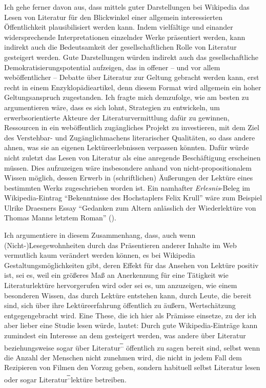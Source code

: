 \documentclass[fontsize=12pt]{scrartcl}
\begin{document}
Ich gehe ferner davon aus, dass mittels guter Darstellungen bei Wi\-ki\-pe\-dia das Lesen von Li\-te\-ra\-tur f\"ur den Blickwinkel einer allgemein interessierten \"Of\-fent\-lichkeit plausibilisiert werden kann. Indem vielf\"altige und einander widersprechende Interpretationen einzelnder Werke pr\"asentiert werden, kann indirekt auch die Bedeutsamkeit der ge\-sell\-schaftlichen Rolle von Li\-te\-ra\-tur gesteigert werden. Gute Darstellungen w\"urden indirekt auch das ge\-sell\-schaftliche Demokratisierungspotential aufzeigen, das in offener -- und vor allem web\"of\-fent\-licher -- Debatte \"uber Li\-te\-ra\-tur zur Geltung gebracht werden kann, erst recht in einem Enzy\-klop\"adieartikel, denn diesem Format wird allgemein ein hoher Geltungsanspruch zugestanden. Ich fragte mich demzufolge, wie am besten zu argumentieren w\"are, dass es sich lohnt, Strategien zu entwickeln, um erwerbsorientierte Akteure\textsuperscript{\tiny *} der Li\-te\-ra\-tur\-ver\-mitt\-lung daf\"ur zu gewinnen, Ressourcen in ein web\"of\-fent\-lich zug\"ang\-liches Projekt zu investieren, mit dem Ziel des Verstehbar- und Zug\"ang\-lichmachens li\-te\-ra\-rischer Qualit\"aten, so dass andere ahnen, was sie an eigenen Lekt\"ureerlebnissen verpassen k\"onnten. Daf\"ur w\"urde nicht zu\-letzt das Lesen von Li\-te\-ra\-tur als eine anregende Besch\"aftigung erscheinen m\"ussen. Dies aufzuzeigen w\"are insbesondere anhand von nicht-pro\-po\-si\-ti\-o\-na\-lem Wissen m\"oglich, dessen Erwerb in (schriftlichen) \"Au{\ss}erungen der Lekt\"ure eines bestimmten Werks zugeschrieben worden ist. Ein namhafter \textit{Erlesnis}-Beleg im Wiki\-pedia-Ein\-trag "`Bekenntnisse des Hoch\-stap\-lers Felix Krull"' w\"are zum Beispiel Ulrike Draesners Essay "`Gedanken zum Altern anl\"asslich der Wiederlekt\"ure von Thomas Manns letztem Roman"' (\cite{Draesner2013}). 

Ich argumentiere in diesem Zusammenhang, dass, auch wenn \mbox{(Nicht-)}\-Lese\-ge\-wohn\-hei\-ten durch das Pr\"asentieren an\-de\-rer Inhalte im Web vermutlich kaum ver\"andert werden k\"onnen, es bei Wi\-ki\-pe\-dia Gestaltungsm\"oglichkeiten gibt, deren Effekt f\"ur das Ansehen von Lekt\"ure positiv ist, sei es, weil ein gr\"o{\ss}eres Ma{\ss} an Anerkennung f\"ur eine T\"atigkeit wie Li\-te\-ra\-tur\-lekt\"ure hervorgerufen wird oder sei es, um anzuzeigen, wie einem besonderen Wissen, das durch Lekt\"ure entstehen kann, durch Leute, die bereit sind, sich \"uber ihre Lekt\"ureerfah\-rung \"of\-fent\-lich zu \"au{\ss}ern, Wertsch\"atzung entgegengebracht wird. Eine These, die ich \mbox{hier} als Pr\"amisse einsetze, zu der ich aber lieber eine Studie lesen w\"urde, lautet: Durch gute Wi\-ki\-pe\-dia-Eintr\"age kann zumindest ein Interesse an dem gesteigert werden, was andere \"uber Li\-te\-ra\-tur beziehungsweise sogar \"uber Li\-te\-ra\-tur\textsuperscript{\~.\~.} \"of\-fent\-lich zu sagen bereit sind, \mbox{selbst} wenn die Anzahl der Menschen nicht zunehmen wird, die nicht in jedem Fall dem Rezipieren von Filmen den Vorzug geben, sondern habituell \mbox{selbst} Li\-te\-ra\-tur lesen oder sogar Li\-te\-ra\-tur\textsuperscript{\~.\~.}lekt\"ure betreiben. 
\end{document}
